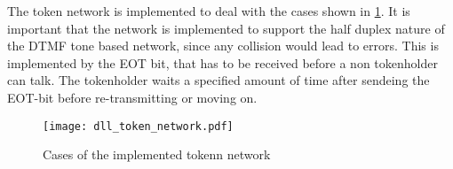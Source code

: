 The token network is implemented to deal with the cases shown in
\ref{fig:dll_token_network}. It is important that the network is implemented to
support the half duplex nature of the DTMF tone based network, since any
collision would lead to errors. This is implemented by the EOT bit, that has to
be received before a non tokenholder can talk. The tokenholder waits a specified
amount of time after sendeing the EOT-bit before re-transmitting or moving on.

\begin{figure}[htb]
	\begin{center}
	\texttt{[image: dll\_token\_network.pdf]}
	\caption{Cases of the implemented tokenn network}
	\label{fig:dll_token_network}	
	\end{center}
\end{figure}